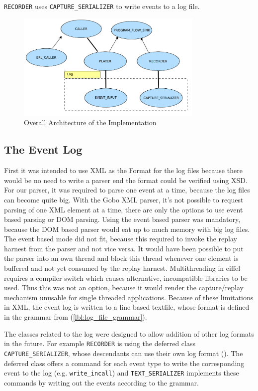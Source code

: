 \texttt{RECORDER} uses \texttt{CAPTURE\_SERIALIZER} to write events to a log file.
\begin{figure}[ht]
  \centering
  \includegraphics[width=0.8\textwidth]{illustrations/implementation_overall_architecture}
  \caption{Overall Architecture of the Implementation}
  \label{fig:implementation_overall_architecture}
\end{figure}

\subsection{The Event Log}
First it was intended to use XML as the Format for the log files because there would be no need to write a parser end the format could be verified using XSD. For our parser, it was required to parse one event at a time, because the log files can become quite big. With the Gobo XML parser, it's not possible to request parsing of one XML element at a time, there are only the options to use event based parsing or DOM parsing. Using the event based parser was mandatory, because the DOM based parser would eat up to much memory with big log files. The event based mode did not fit, because this required to invoke the replay harnest from the parser and not vice versa. It would have been possible to put the parser into an own thread and block this thread whenever one element is buffered and not yet consumed by the replay harnest. Multithreading in eiffel requires a compiler switch which causes alternative, incompatible libraries to be used. Thus this was not an option, because it would render the capture/replay mechanism unusable for single threaded applications.
Because of these limitations in XML, the event log is written to a line based textfile, whose format is defined in the grammar from (\ref{lbl:log_file_grammar}).

The classes related to the log were designed to allow addition of other log formats in the future. For example \texttt{RECORDER} is using the deferred class \texttt{CAPTURE\_SERIALIZER}, whose descendants can use their own log format (). The deferred class offers a command for each event type to write the corresponding event to the log (e.g. \texttt{write\_incall}) and \texttt{TEXT\_SERIALIZER} implements these commands by writing out the events according to the grammar.

